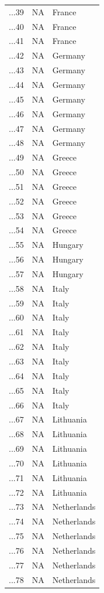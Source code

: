 \begin{longtable}{lrl}
...39 & NA & France\\
...40 & NA & France\\
\addlinespace
...41 & NA & France\\
...42 & NA & Germany\\
...43 & NA & Germany\\
...44 & NA & Germany\\
...45 & NA & Germany\\
\addlinespace
...46 & NA & Germany\\
...47 & NA & Germany\\
...48 & NA & Germany\\
...49 & NA & Greece\\
...50 & NA & Greece\\
\addlinespace
...51 & NA & Greece\\
...52 & NA & Greece\\
...53 & NA & Greece\\
...54 & NA & Greece\\
...55 & NA & Hungary\\
\addlinespace
...56 & NA & Hungary\\
...57 & NA & Hungary\\
...58 & NA & Italy\\
...59 & NA & Italy\\
...60 & NA & Italy\\
\addlinespace
...61 & NA & Italy\\
...62 & NA & Italy\\
...63 & NA & Italy\\
...64 & NA & Italy\\
...65 & NA & Italy\\
\addlinespace
...66 & NA & Italy\\
...67 & NA & Lithuania\\
...68 & NA & Lithuania\\
...69 & NA & Lithuania\\
...70 & NA & Lithuania\\
\addlinespace
...71 & NA & Lithuania\\
...72 & NA & Lithuania\\
...73 & NA & Netherlands\\
...74 & NA & Netherlands\\
...75 & NA & Netherlands\\
\addlinespace
...76 & NA & Netherlands\\
...77 & NA & Netherlands\\
...78 & NA & Netherlands\\

\end{longtable}
